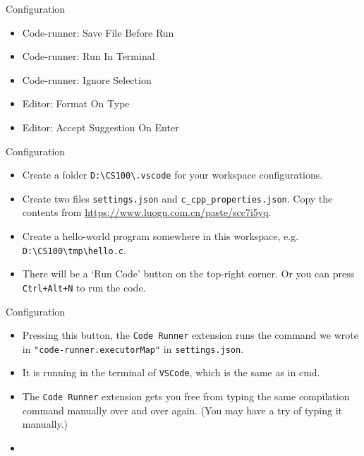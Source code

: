\documentclass[handout]{beamer}
\begin{document}
\begin{frame}{Configuration}
    \begin{itemize}
        \item Code-runner: Save File Before Run\quad{}
        \item Code-runner: Run In Terminal\quad{}
        \item Code-runner: Ignore Selection\quad{}
        \item Editor: Format On Type\quad{}
        \item Editor: Accept Suggestion On Enter\quad{}
    \end{itemize}
\end{frame}

\begin{frame}{Configuration}
    \begin{itemize}
        \item Create a folder \texttt{D:\textbackslash CS100\textbackslash .vscode} for your workspace configurations.
        \item Create two files \texttt{settings.json} and \texttt{c\_cpp\_properties.json}. Copy the contents from \url{https://www.luogu.com.cn/paste/scc7i5yq}.
        \pause
        \item Create a hello-world program somewhere in this workspace, e.g. \texttt{D:\textbackslash CS100\textbackslash tmp\textbackslash hello.c}.
        \item There will be a `Run Code' button on the top-right corner. Or you can press \texttt{Ctrl+Alt+N} to run the code.
    \end{itemize}
\end{frame}

\begin{frame}{Configuration}
    \begin{itemize}
        \item Pressing this button, the \texttt{Code Runner} extension runs the command we wrote in \texttt{"code-runner.executorMap"} in \texttt{settings.json}.
        \item It is running in the terminal of \texttt{VSCode}, which is the same as in cmd.
        \item The \texttt{Code Runner} extension gets you free from typing the same compilation command manually over and over again. (You may have a try of typing it manually.)
        \item {}
    \end{itemize}
\end{frame}
\end{document}
